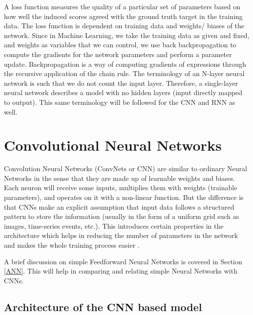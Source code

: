 A loss function measures the quality of a particular set of parameters based on how well the induced scores agreed with the ground truth target in the training data. The loss function is dependent on training data and weights/ biases of the network. Since in Machine Learning, we take the training data as given and fixed, and weights as variables that we can control, we use back backpropagation to compute the gradients for the network parameters and perform a parameter update. Backpropagation is a way of computing gradients of expressions through the recursive application of the chain rule. The terminology of an N-layer neural network is such that we do not count the input layer. Therefore, a single-layer neural network describes a model with no hidden layers (input directly mapped to output). This same terminology will be followed for the CNN and RNN as well.

\section{Convolutional Neural Networks} \label{sec:CNN_CNN}
Convolution Neural Networks (ConvNets or CNN) are similar to ordinary Neural Networks in the sense that they are made up of learnable weights and biases. Each neuron will receive some inputs, multiplies them with weights (trainable parameters), and operates on it with a non-linear function. But the difference is that CNNs make an explicit assumption that input data follows a structured pattern to store the information (usually in the form of a uniform grid such as images, time-series events, etc.). This introduces certain properties in the architecture which helps in reducing the number of parameters in the network and makes the whole training process easier \parencite{goodfellow2016deep}.

A brief discussion on simple Feedforward Neural Networks is covered in Section \ref{ANN}. This will help in comparing and relating simple Neural Networks with CNNs.

\subsection{Architecture of the CNN based model} \label{sec:Arch_CNN}

